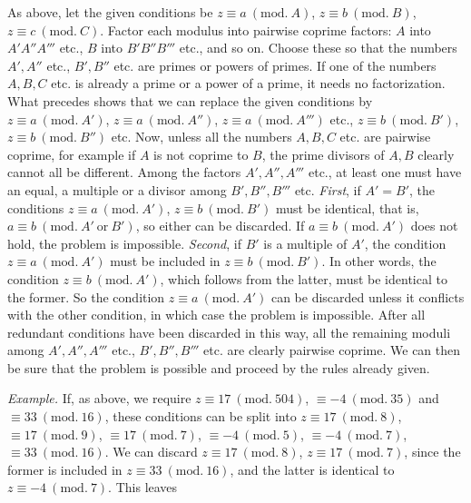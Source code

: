 
As above, let the given conditions be $z\equiv a\ (\mathrm{mod.}\ A)$, $z\equiv b\ (\mathrm{mod.}\ B)$, $z\equiv c\ (\mathrm{mod.}\ C)$. Factor each modulus into pairwise coprime factors: $A$ into $A'A''A'''$ etc., $B$ into $B'B''B'''$ etc., and so on. Choose these so that the numbers $A',A''$ etc., $B',B''$ etc. are primes or powers of primes. If one of the numbers $A,B,C$ etc. is already a prime or a power of a prime, it needs no factorization. What precedes shows that we can replace the given conditions by $z\equiv a\ (\mathrm{mod.}\ A')$, $z\equiv a\ (\mathrm{mod.}\ A'')$, $z\equiv a\ (\mathrm{mod.}\ A''')$ etc., $z\equiv b\ (\mathrm{mod.}\ B')$, $z\equiv b\ (\mathrm{mod.}\ B'')$ etc. Now, unless all the numbers $A,B,C$ etc. are pairwise coprime, for example if $A$ is not coprime to $B$, the prime divisors of $A,B$ clearly cannot all be different. Among the factors $A',A'',A'''$ etc., at least one must have an equal, a multiple or a divisor among $B',B'',B'''$ etc. \emph{First}, if $A'=B'$, the conditions $z\equiv a\ (\mathrm{mod.}\ A')$, $z\equiv b\ (\mathrm{mod.}\ B')$ must be identical, that is, $a\equiv b\ (\mathrm{mod.}\ A'\ \text{or}\ B')$, so either can be discarded. If $a\equiv b\ (\mathrm{mod.}\ A')$ does not hold, the problem is impossible. \emph{Second}, if $B'$ is a multiple of $A'$, the condition $z\equiv a\ (\mathrm{mod.}\ A')$ must be included in $z\equiv b\ (\mathrm{mod.}\ B')$. In other words, the condition $z\equiv b\ (\mathrm{mod.}\ A')$, which follows from the latter, must be identical to the former. So the condition $z\equiv a\ (\mathrm{mod.}\ A')$ can be discarded unless it conflicts with the other condition, in which case the problem is impossible. After all redundant conditions have been discarded in this way, all the remaining moduli among $A',A'',A'''$ etc., $B',B'',B'''$ etc. are clearly pairwise coprime. We can then be sure that the problem is possible and proceed by the rules already given.


\emph{Example.} If, as above, we require $z\equiv 17\ (\mathrm{mod.}\ 504)$, $\equiv -4\ (\mathrm{mod.}\ 35)$ and $\equiv 33\ (\mathrm{mod.}\ 16)$, these conditions can be split into $z\equiv 17\ (\mathrm{mod.}\ 8)$, $\equiv 17\ (\mathrm{mod.}\ 9)$, $\equiv 17\ (\mathrm{mod.}\ 7)$, $\equiv -4\ (\mathrm{mod.}\ 5)$, $\equiv -4\ (\mathrm{mod.}\ 7)$, $\equiv 33\ (\mathrm{mod.}\ 16)$. We can discard $z\equiv 17\ (\mathrm{mod.}\ 8)$, $z\equiv 17\ (\mathrm{mod.}\ 7)$, since the former is included in $z\equiv 33\ (\mathrm{mod.}\ 16)$, and the latter is identical to $z\equiv -4\ (\mathrm{mod.}\ 7)$. This leaves

